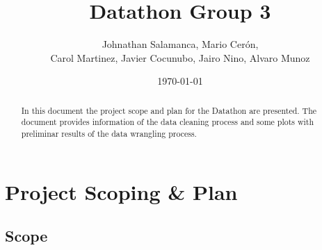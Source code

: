 \documentclass[11pt]{article}
\title{Datathon Group 3}
\author{ Johnathan Salamanca, Mario Cer\'{o}n, \\
Carol Martinez, Javier Cocunubo, Jairo Nino, Alvaro Munoz
 }
\date{\today}
\begin{document}
\maketitle

\begin{abstract}

In this document the project scope and plan for the Datathon are presented. The document provides information of the data cleaning process and some plots with preliminar results of the data wrangling process.


\end{abstract}



\section{Project Scoping \& Plan}
\label{sec:app}

\subsection{Scope}
\end{document}
